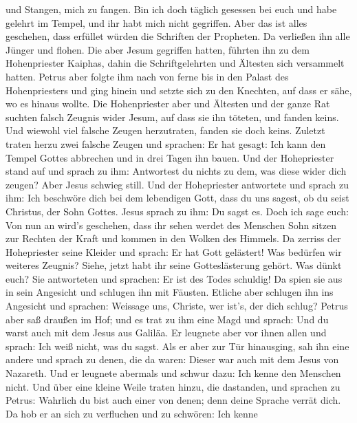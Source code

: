 und Stangen, mich zu fangen. Bin ich doch täglich gesessen bei euch und
habe gelehrt im Tempel, und ihr habt mich nicht gegriffen. 
Aber das ist alles geschehen, dass erfüllet würden die Schriften der
Propheten. Da verließen ihn alle Jünger und flohen.  Die
aber Jesum gegriffen hatten, führten ihn zu dem Hohenpriester Kaiphas,
dahin die Schriftgelehrten und Ältesten sich versammelt hatten.
 Petrus aber folgte ihm nach von ferne bis in den Palast
des Hohenpriesters und ging hinein und setzte sich zu den Knechten, auf
dass er sähe, wo es hinaus wollte.  Die Hohenpriester aber
und Ältesten und der ganze Rat suchten falsch Zeugnis wider Jesum, auf
dass sie ihn töteten,  und fanden keins. Und wiewohl viel
falsche Zeugen herzutraten, fanden sie doch keins. Zuletzt traten herzu
zwei falsche Zeugen  und sprachen: Er hat gesagt: Ich kann
den Tempel Gottes abbrechen und in drei Tagen ihn bauen. 
Und der Hohepriester stand auf und sprach zu ihm: Antwortest du nichts
zu dem, was diese wider dich zeugen?  Aber Jesus schwieg
still. Und der Hohepriester antwortete und sprach zu ihm: Ich beschwöre
dich bei dem lebendigen Gott, dass du uns sagest, ob du seist Christus,
der Sohn Gottes.  Jesus sprach zu ihm: Du sagst es. Doch
ich sage euch: Von nun an wird's geschehen, dass ihr sehen werdet des
Menschen Sohn sitzen zur Rechten der Kraft und kommen in den Wolken des
Himmels.  Da zerriss der Hohepriester seine Kleider und
sprach: Er hat Gott gelästert! Was bedürfen wir weiteres Zeugnis? Siehe,
jetzt habt ihr seine Gotteslästerung gehört.  Was dünkt
euch? Sie antworteten und sprachen: Er ist des Todes schuldig!
 Da spien sie aus in sein Angesicht und schlugen ihn mit
Fäusten. Etliche aber schlugen ihn ins Angesicht  und
sprachen: Weissage uns, Christe, wer ist's, der dich schlug?
 Petrus aber saß draußen im Hof; und es trat zu ihm eine
Magd und sprach: Und du warst auch mit dem Jesus aus Galiläa.
 Er leugnete aber vor ihnen allen und sprach: Ich weiß
nicht, was du sagst.  Als er aber zur Tür hinausging, sah
ihn eine andere und sprach zu denen, die da waren: Dieser war auch mit
dem Jesus von Nazareth.  Und er leugnete abermals und
schwur dazu: Ich kenne den Menschen nicht.  Und über eine
kleine Weile traten hinzu, die dastanden, und sprachen zu Petrus:
Wahrlich du bist auch einer von denen; denn deine Sprache verrät dich.
 Da hob er an sich zu verfluchen und zu schwören: Ich kenne
